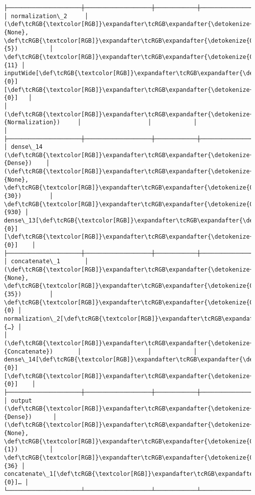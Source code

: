 \documentclass[12pt letter]{report}
\begin{document}
\begin{Verbatim}[commandchars=\\\{\}]
├─────────────────────┼───────────────────┼────────────┼───────────────────┤
│ normalization\_2     │ (\def\tcRGB{\textcolor[RGB]}\expandafter\tcRGB\expandafter{\detokenize{0,215,255}}{None}, \def\tcRGB{\textcolor[RGB]}\expandafter\tcRGB\expandafter{\detokenize{0,175,0}}{5})         │         \def\tcRGB{\textcolor[RGB]}\expandafter\tcRGB\expandafter{\detokenize{0,175,0}}{11} │ inputWide[\def\tcRGB{\textcolor[RGB]}\expandafter\tcRGB\expandafter{\detokenize{0,175,0}}{0}][\def\tcRGB{\textcolor[RGB]}\expandafter\tcRGB\expandafter{\detokenize{0,175,0}}{0}]   │
│ (\def\tcRGB{\textcolor[RGB]}\expandafter\tcRGB\expandafter{\detokenize{0,135,255}}{Normalization})     │                   │            │                   │
├─────────────────────┼───────────────────┼────────────┼───────────────────┤
│ dense\_14 (\def\tcRGB{\textcolor[RGB]}\expandafter\tcRGB\expandafter{\detokenize{0,135,255}}{Dense})    │ (\def\tcRGB{\textcolor[RGB]}\expandafter\tcRGB\expandafter{\detokenize{0,215,255}}{None}, \def\tcRGB{\textcolor[RGB]}\expandafter\tcRGB\expandafter{\detokenize{0,175,0}}{30})        │        \def\tcRGB{\textcolor[RGB]}\expandafter\tcRGB\expandafter{\detokenize{0,175,0}}{930} │ dense\_13[\def\tcRGB{\textcolor[RGB]}\expandafter\tcRGB\expandafter{\detokenize{0,175,0}}{0}][\def\tcRGB{\textcolor[RGB]}\expandafter\tcRGB\expandafter{\detokenize{0,175,0}}{0}]    │
├─────────────────────┼───────────────────┼────────────┼───────────────────┤
│ concatenate\_1       │ (\def\tcRGB{\textcolor[RGB]}\expandafter\tcRGB\expandafter{\detokenize{0,215,255}}{None}, \def\tcRGB{\textcolor[RGB]}\expandafter\tcRGB\expandafter{\detokenize{0,175,0}}{35})        │          \def\tcRGB{\textcolor[RGB]}\expandafter\tcRGB\expandafter{\detokenize{0,175,0}}{0} │ normalization\_2[\def\tcRGB{\textcolor[RGB]}\expandafter\tcRGB\expandafter{\detokenize{0,175,0}}{…} │
│ (\def\tcRGB{\textcolor[RGB]}\expandafter\tcRGB\expandafter{\detokenize{0,135,255}}{Concatenate})       │                   │            │ dense\_14[\def\tcRGB{\textcolor[RGB]}\expandafter\tcRGB\expandafter{\detokenize{0,175,0}}{0}][\def\tcRGB{\textcolor[RGB]}\expandafter\tcRGB\expandafter{\detokenize{0,175,0}}{0}]    │
├─────────────────────┼───────────────────┼────────────┼───────────────────┤
│ output (\def\tcRGB{\textcolor[RGB]}\expandafter\tcRGB\expandafter{\detokenize{0,135,255}}{Dense})      │ (\def\tcRGB{\textcolor[RGB]}\expandafter\tcRGB\expandafter{\detokenize{0,215,255}}{None}, \def\tcRGB{\textcolor[RGB]}\expandafter\tcRGB\expandafter{\detokenize{0,175,0}}{1})         │         \def\tcRGB{\textcolor[RGB]}\expandafter\tcRGB\expandafter{\detokenize{0,175,0}}{36} │ concatenate\_1[\def\tcRGB{\textcolor[RGB]}\expandafter\tcRGB\expandafter{\detokenize{0,175,0}}{0}]… │
└─────────────────────┴───────────────────┴────────────┴───────────────────┘

    \end{Verbatim}
\end{document}
